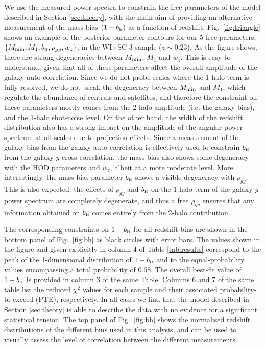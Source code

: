\documentclass[useAMS,usenatbib]{mn2e}
\newcommand{\wisc}{WI$\times$SC}
\def\bH{b_{\scriptscriptstyle\rm H}}
\begin{document}
      We use the measured power spectra to constrain the free parameters of the model described in Section \ref{sec:theory}, with the main aim of providing an alternative measurement of the mass bias $(1-\bH)$ as a function of redshift. Fig.\!~\ref{fig:triangle} shows an example of the posterior parameter contours for our 5 free parameters, $\{M_{\rm min},M_1,\bH,\rho_{gy},w_z\}$, in the \wisc-3 sample ($z\sim0.23$). As the figure shows, there are strong degeneracies between $M_{\rm min}$, $M_1$ and $w_z$. This is easy to understand, given that all of these parameters affect the overall amplitude of the galaxy auto-correlation. Since we do not probe scales where the 1-halo term is fully resolved, we do not break the degeneracy between $M_{\rm min}$ and $M_1$, which regulate the abundance of centrals and satellites, and therefore the constraint on these parameters mostly comes from the 2-halo amplitude (i.e. the galaxy bias), and the 1-halo shot-noise level. On the other hand, the width of the redshift distribution also has a strong impact on the amplitude of the angular power spectrum at all scales due to projection effects. Since a measurement of the galaxy bias from the galaxy auto-correlation is effectively used to constrain $\bH$ from the galaxy-$y$ cross-correlation, the mass bias also shows some degeneracy with the HOD parameters and $w_z$, albeit at a more moderate level. More interestingly, the mass-bias parameter $\bH$ shows a visible degeneracy with $\rho_{gy}$. This is also expected: the effects of $\rho_{gy}$ and $\bH$ on the 1-halo term of the galaxy-$y$ power spectrum are completely degenerate, and thus a free $\rho_{gy}$ ensures that any information obtained on $\bH$ comes entirely from the 2-halo contribution.
      
      The corresponding constraints on $1-\bH$ for all redshift bins are shown in the bottom panel of Fig.\!~\ref{fig:bh} as black circles with error bars. The values shown in the figure and given explicitly in column 4 of Table \ref{tab:results} correspond to the peak of the 1-dimensional distribution of $1-\bH$ and to the equal-probability values encompassing a total probability of 0.68. The overall best-fit value of $1-\bH$ is provided in column 3 of the same Table. Columns 6 and 7 of the same table list the reduced $\chi^2$ values for each sample and their associated probability-to-exceed (PTE), respectively. In all cases we find that the model described in Section \ref{sec:theory} is able to describe the data with no evidence for a significant statistical tension. The top panel of Fig.\!~\ref{fig:bh} shows the normalised redshift distributions of the different bins used in this analysis, and can be used to visually assess the level of correlation between the different measurements.
      
\end{document}
